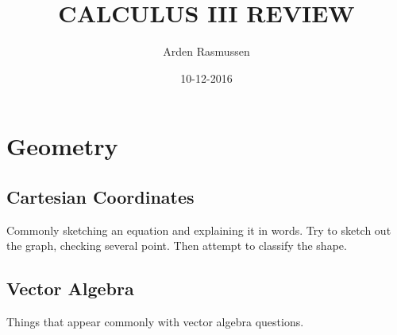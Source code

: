 \documentclass{article}
\title{CALCULUS III REVIEW}
\date{10-12-2016}
\author{Arden Rasmussen}
\begin{document}
\maketitle
\newpage
\tableofcontents
\newpage
{}
\section{Geometry}
\subsection{Cartesian Coordinates}
Commonly sketching an equation and explaining it in words. Try to sketch out the graph, checking several point. Then attempt to classify the shape.
\subsection{Vector Algebra}
Things that appear commonly with vector algebra questions.
\end{document}
